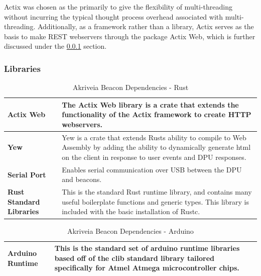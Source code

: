 \bigskip
Actix was chosen as the primarily to give the flexibility of multi-threading without incurring the typical thought process overhead associated with multi-threading. Additionally, as a framework rather than a library, Actix serves as the basis to make REST webservers through the package \Gls{Actix Web}, which is further discussed under the \ref{software_libraries} section.

\subsubsection{Libraries}
\label{software_libraries}
\medskip
\begin{table}[H]
\centering
\begin{tabular}{ | m{3.25cm} | m{12.5cm} |}
	\hline
	\textbf{Actix Web} & The Actix Web library is a crate that extends the functionality of the Actix framework to create \Gls{HTTP} webservers. \\
	\hline
	\textbf{Yew} & Yew is a crate that extends Rusts ability to compile to Web Assembly by adding the ability to dynamically generate html on the client in response to user events and DPU responses. \\
	\hline
	\textbf{Serial Port} & Enables serial communication over USB between the DPU and beacons.\\
	\hline
	\textbf{Rust Standard Libraries} & This is the standard Rust runtime library, and contains many useful boilerplate functions and generic types. This library is included with the basic installation of Rustc. \\
	\hline
\end{tabular}
\caption{Akriveia Beacon Dependencies - Rust}
\end{table}

\begin{table}[H]
\centering
\begin{tabular}{ | m{3.25cm} | m{12.5cm} |}
	\hline
	\textbf{Arduino Runtime} & This is the standard set of arduino runtime libraries based off of the clib standard library tailored specifically for Atmel Atmega microcontroller chips. \\
	\hline
\end{tabular}
\caption{Akriveia Beacon Dependencies - Arduino}
\end{table}

\bigskip
